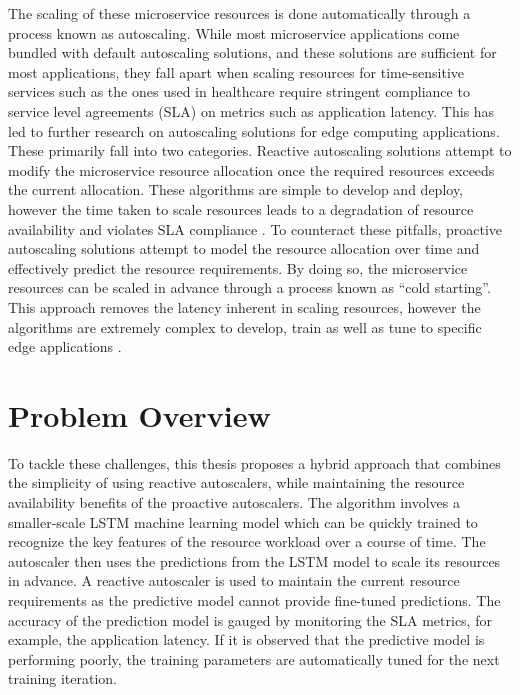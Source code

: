 The scaling of these microservice resources is done automatically through a process known as autoscaling. While most microservice applications come bundled with default autoscaling solutions, and these solutions are sufficient for most applications, they fall apart when scaling resources for time-sensitive services such as the ones used in healthcare require stringent compliance to service level agreements (SLA) on metrics such as application latency. This has led to further research on autoscaling solutions for edge computing applications. These primarily fall into two categories. Reactive autoscaling solutions attempt to modify the microservice resource allocation once the required resources exceeds the current allocation. These algorithms are simple to develop and deploy, however the time taken to scale resources leads to a degradation of resource availability and violates SLA compliance \cite{podolskiy2018iaas}. To counteract these pitfalls, proactive autoscaling solutions attempt to model the resource allocation over time and effectively predict the resource requirements. By doing so, the microservice resources can be scaled in advance through a process known as ``cold starting''. This approach removes the latency inherent in scaling resources, however the algorithms are extremely complex to develop, train as well as tune to specific edge applications \cite{straesser2022not}.

\section{Problem Overview}
\label{sec:problem-overview}

To tackle these challenges, this thesis proposes a hybrid approach that combines the simplicity of using reactive autoscalers, while maintaining the resource availability benefits of the proactive autoscalers. The algorithm involves a smaller-scale LSTM machine learning model which can be quickly trained to recognize the key features of the resource workload over a course of time. The autoscaler then uses the predictions from the LSTM model to scale its resources in advance. A reactive autoscaler is used to maintain the current resource requirements as the predictive model cannot provide fine-tuned predictions. The accuracy of the prediction model is gauged by monitoring the SLA metrics, for example, the application latency. If it is observed that the predictive model is performing poorly, the training parameters are automatically tuned for the next training iteration.\par

